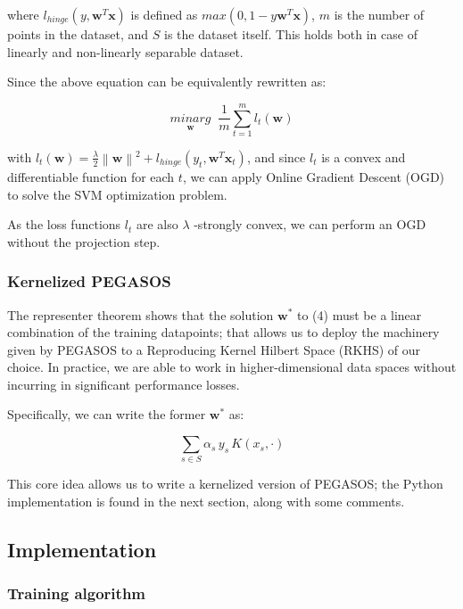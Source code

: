 \documentclass[a4paper]{article}
\begin{document}
where \(l_{hinge}(y, \boldsymbol{w}^T \boldsymbol{x})\) is defined as \(max(0, 1 - y \boldsymbol{w}^T \boldsymbol{x})\), \(m\) is the number of points in the dataset, and \(S\) is the dataset itself. This holds both in case of linearly and non-linearly separable dataset.

Since the above equation can be equivalently rewritten as:

\begin{equation}
\underset{\boldsymbol{w}}{minarg} \; \; \frac{1}{m} \sum_{t=1}^{m} l_t(\boldsymbol{w})
\end{equation}

with \(l_t(\boldsymbol{w}) = \frac{\lambda}{2}\left \| \boldsymbol{w} \right \|^2 + l_{hinge}(y_t, \boldsymbol{w}^T \boldsymbol{x}_t )\), and since \(l_t\) is a convex and differentiable function for each \(t\), we can apply Online Gradient Descent (OGD) to solve the SVM optimization problem.

As the loss functions \(l_t\) are also \(\lambda\) -strongly convex, we can perform an OGD without the projection step. 

\subsubsection{Kernelized PEGASOS}
\label{sec:org48d76e7}
\label{org1f67d8e}

The representer theorem shows that the solution \(\boldsymbol{w}^*\) to (4) must be a linear combination of the training datapoints; that allows us to deploy the machinery given by PEGASOS to a Reproducing Kernel Hilbert Space (RKHS) of our choice. In practice, we are able to work in higher-dimensional data spaces without incurring in significant performance losses.

Specifically, we can write the former \(\boldsymbol{w}^*\) as: 

\begin{equation}
\sum_{s \in S} \alpha_s \, y_s \, K(x_s, \cdot )
\end{equation}

This core idea allows us to write a kernelized version of PEGASOS; the Python implementation is found in the next section, along with some comments.

\subsection{Implementation}
\label{sec:orgf3c1fa0}

\subsubsection{Training algorithm}
\label{sec:org0a82289}
\end{document}
